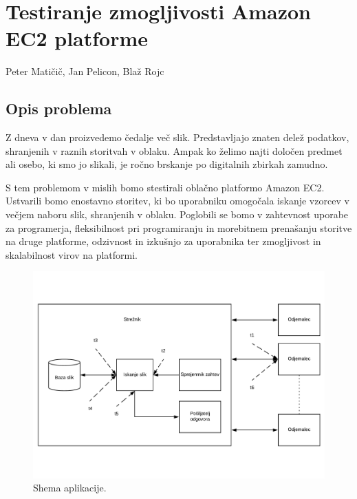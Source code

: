 \chapter[Testiranje zmogljivosti Amazon EC2 platforme (P. Matičič, J. Pelicon, B. Rojc)]{Testiranje zmogljivosti Amazon EC2 platforme}

\pagestyle{fancy}
\fancyhf{}
\fancyhead[LE,RO]{\thepage}
\fancyhead[RE,LO]{\leftmark}

\huge Peter Matičič, Jan Pelicon, Blaž Rojc
\normalsize
\bigskip

\section{Opis problema}

Z dneva v dan proizvedemo čedalje več slik.
Predstavljajo znaten delež podatkov, shranjenih v raznih storitvah v oblaku.
Ampak ko želimo najti določen predmet ali osebo, ki smo jo slikali, je ročno brskanje po digitalnih zbirkah zamudno.

S tem problemom v mislih bomo stestirali oblačno platformo Amazon EC2.
Ustvarili bomo enostavno storitev, ki bo uporabniku omogočala iskanje vzorcev v večjem naboru slik, shranjenih v oblaku.
Poglobili se bomo v zahtevnost uporabe za programerja, fleksibilnost pri programiranju in morebitnem prenašanju storitve na druge platforme,
	odzivnost in izkušnjo za uporabnika ter zmogljivost in skalabilnost virov na platformi.
	
	\begin{figure}[H]
    \centering
    \includegraphics[scale=0.4]{Img/1_shema.pdf}
    \caption{Shema aplikacije.}
    \label{fig:1_osnovnaShema}
\end{figure}

